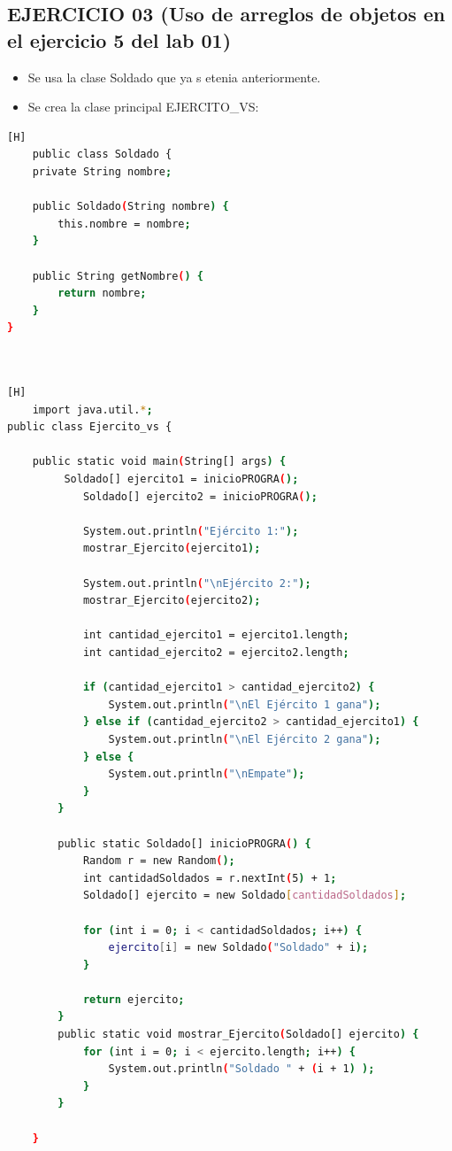 \documentclass{article}
\begin{document}
\subsection{EJERCICIO 03 (Uso de arreglos de objetos en el ejercicio 5 del lab 01)}
	\begin{itemize}	
		\item Se usa la clase Soldado que ya s etenia anteriormente.
		\item Se crea la clase principal EJERCITO_VS:
	\end{itemize}
	
	\begin{lstlisting}[language=bash,caption={Creando la clase soldado}][H]
	public class Soldado {
    private String nombre;

    public Soldado(String nombre) {
        this.nombre = nombre;
    }

    public String getNombre() {
        return nombre;
    }
}
	
	
				\end{lstlisting}
			
			\begin{lstlisting}[language=bash,caption={Creando la clase Ejercito_vs}][H]
	import java.util.*;
public class Ejercito_vs {

	public static void main(String[] args) {
		 Soldado[] ejercito1 = inicioPROGRA();
	        Soldado[] ejercito2 = inicioPROGRA();

	        System.out.println("Ejército 1:");
	        mostrar_Ejercito(ejercito1);

	        System.out.println("\nEjército 2:");
	        mostrar_Ejercito(ejercito2);

	        int cantidad_ejercito1 = ejercito1.length;
	        int cantidad_ejercito2 = ejercito2.length;

	        if (cantidad_ejercito1 > cantidad_ejercito2) {
	            System.out.println("\nEl Ejército 1 gana");
	        } else if (cantidad_ejercito2 > cantidad_ejercito1) {
	            System.out.println("\nEl Ejército 2 gana");
	        } else {
	            System.out.println("\nEmpate");
	        }
	    }

	    public static Soldado[] inicioPROGRA() {
	        Random r = new Random();
	        int cantidadSoldados = r.nextInt(5) + 1;
	        Soldado[] ejercito = new Soldado[cantidadSoldados];

	        for (int i = 0; i < cantidadSoldados; i++) {
	            ejercito[i] = new Soldado("Soldado" + i);
	        }

	        return ejercito;
	    }
	    public static void mostrar_Ejercito(Soldado[] ejercito) {
	        for (int i = 0; i < ejercito.length; i++) {
	            System.out.println("Soldado " + (i + 1) );
	        }
	    }
	
	}
	
	
				\end{lstlisting}
			
\end{document}
